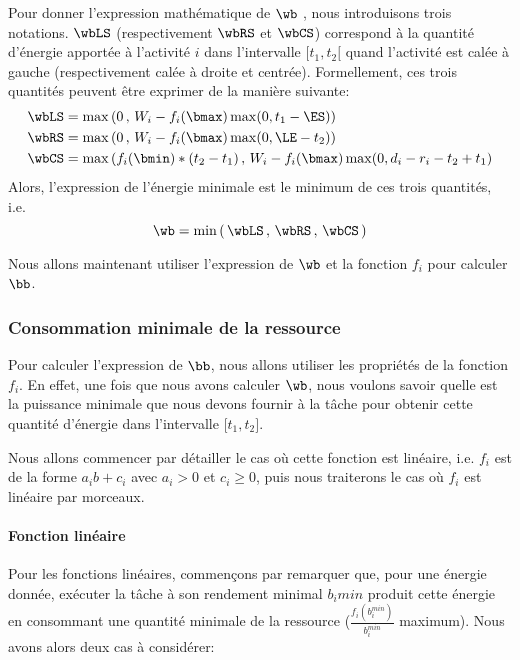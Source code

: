 Pour donner l'expression mathématique de $\wb$ , nous introduisons
trois notations. $\wbLS$ (respectivement $\wbRS$ et $\wbCS$)
correspond à la quantité d'énergie apportée à l'activité $i$ dans
l'intervalle $[t_1,t_2[$ quand l'activité est calée à gauche
(respectivement calée à droite et centrée). Formellement, ces trois
quantités peuvent être exprimer de la manière suivante:
\begin{align}
\wbLS&= \max\left(0\, ,\, W_i- f_i(\bmax)\max(0,t_1 - \ES)\right) \label{eq:LSnrj_CECSP}\\
\wbRS&= \max\left(0\, ,\, W_i- f_i(\bmax)\max(0, \LE-t_2)\right)\label{eq:RSnrj_CECSP}\\
\wbCS&=\max\left( f_i(\bmin) * (t_2-t_1)\, ,\, W_i - f_i(\bmax)\max(0,
       d_i - r_ i - t_2 + t_1 \right)\label{eq:CSnrj_CECSP}
\end{align}
Alors, l'expression de l'énergie minimale est le minimum de ces trois
quantités, i.e.
\begin{equation}
\wb=\min\left(\, \wbLS\, ,\,\wbRS\, ,\,\wbCS \, \right)
\end{equation} 

Nous allons maintenant utiliser l'expression de $\wb$ et la fonction
$f_i$ pour calculer $\bb$.

\subsubsection{Consommation minimale de la ressource}
	
Pour calculer l'expression de $\bb$, nous allons utiliser les
propriétés de la fonction $f_i$. En effet, une fois que nous avons
calculer $\wb$, nous voulons savoir quelle est la puissance minimale
que nous devons fournir à la tâche pour obtenir cette quantité
d'énergie dans l'intervalle ${[}t_1,t_2{]}$.

Nous allons commencer par détailler le cas où cette fonction est
linéaire, i.e. $f_i$ est de la forme $a_ib+c_i$ avec $a_i >0$ et $c_i
\ge 0$, puis nous traiterons le cas où $f_i$ est linéaire par
morceaux.
	
\paragraph{Fonction linéaire}
	
Pour les fonctions linéaires, commençons par remarquer que, pour une énergie donnée, exécuter la tâche à son rendement minimal $b_i{min}$ produit cette énergie en consommant une quantité minimale de la ressource ($\frac{f_i(b_i^{min})}{b_i^{min}}$ maximum). Nous avons alors deux cas à considérer:
	
